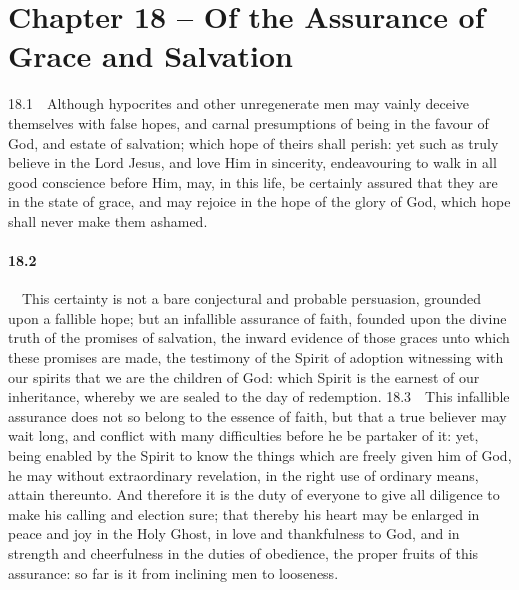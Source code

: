 \section{Chapter 18 -- Of the Assurance of Grace and Salvation} 18.1\ \ Although hypocrites and other unregenerate men may vainly deceive themselves with false hopes, and carnal presumptions of being in the favour of God, and estate of salvation; which hope of theirs shall perish: yet such as truly believe in the Lord Jesus, and love Him in sincerity, endeavouring to walk in all good conscience before Him, may, in this life, be certainly assured that they are in the state of grace, and may rejoice in the hope of the glory of God, which hope shall never make them ashamed.   
\bigskip
\paragraph{18.2}\ \ This certainty is not a bare conjectural and probable persuasion, grounded upon a fallible hope; but an infallible assurance of faith, founded upon the divine truth of the promises of salvation, the inward evidence of those graces unto which these promises are made, the testimony of the Spirit of adoption witnessing with our spirits that we are the children of God: which Spirit is the earnest of our inheritance, whereby we are sealed to the day of redemption.  18.3\ \ This infallible assurance does not so belong to the essence of faith, but that a true believer may wait long, and conflict with many difficulties before he be partaker of it: yet, being enabled by the Spirit to know the things which are freely given him of God, he may without extraordinary revelation, in the right use of ordinary means, attain thereunto. And therefore it is the duty of everyone to give all diligence to make his calling and election sure; that thereby his heart may be enlarged in peace and joy in the Holy Ghost, in love and thankfulness to God, and in strength and cheerfulness in the duties of obedience, the proper fruits of this assurance: so far is it from inclining men to looseness.   
\bigskip
